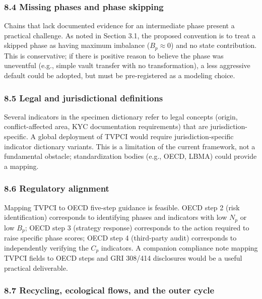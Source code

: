 \documentclass[
  11pt,
  letterpaper,
]{article}
\begin{document}
\subsubsection{8.4 Missing phases and phase
skipping}\label{missing-phases-and-phase-skipping}

Chains that lack documented evidence for an intermediate phase present a
practical challenge. As noted in Section 3.1, the proposed convention is
to treat a skipped phase as having maximum imbalance (\(B_p \approx 0\))
and no state contribution. This is conservative; if there is positive
reason to believe the phase was uneventful (e.g., simple vault transfer
with no transformation), a less aggressive default could be adopted, but
must be pre-registered as a modeling choice.

\subsubsection{8.5 Legal and jurisdictional
definitions}\label{legal-and-jurisdictional-definitions}

Several indicators in the specimen dictionary refer to legal concepts
(origin, conflict-affected area, KYC documentation requirements) that
are jurisdiction-specific. A global deployment of TVPCI would require
jurisdiction-specific indicator dictionary variants. This is a
limitation of the current framework, not a fundamental obstacle;
standardization bodies (e.g., OECD, LBMA) could provide a mapping.

\subsubsection{8.6 Regulatory alignment}\label{regulatory-alignment}

Mapping TVPCI to OECD five-step guidance is feasible. OECD step 2 (risk
identification) corresponds to identifying phases and indicators with
low \(N_p\) or low \(B_p\); OECD step 3 (strategy response) corresponds
to the action required to raise specific phase scores; OECD step 4
(third-party audit) corresponds to independently verifying the \(C_p\)
indicators. A companion compliance note mapping TVPCI fields to OECD
steps and GRI 308/414 disclosures would be a useful practical
deliverable.

\subsubsection{8.7 Recycling, ecological flows, and the outer
cycle}\label{recycling-ecological-flows-and-the-outer-cycle}
\end{document}
